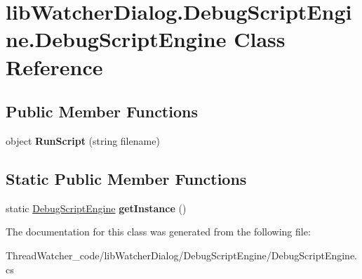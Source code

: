 \hypertarget{classlib_watcher_dialog_1_1_debug_script_engine_1_1_debug_script_engine}{\section{lib\+Watcher\+Dialog.\+Debug\+Script\+Engine.\+Debug\+Script\+Engine Class Reference}
\label{classlib_watcher_dialog_1_1_debug_script_engine_1_1_debug_script_engine}
}
\subsection*{Public Member Functions}
\begin{DoxyCompactItemize}
\item 
\hypertarget{classlib_watcher_dialog_1_1_debug_script_engine_1_1_debug_script_engine_afef7959aa8fde58b2cc10200ee3cbfa8}{object {\bfseries Run\+Script} (string filename)}\label{classlib_watcher_dialog_1_1_debug_script_engine_1_1_debug_script_engine_afef7959aa8fde58b2cc10200ee3cbfa8}

\end{DoxyCompactItemize}
\subsection*{Static Public Member Functions}
\begin{DoxyCompactItemize}
\item 
\hypertarget{classlib_watcher_dialog_1_1_debug_script_engine_1_1_debug_script_engine_a25130dc30396db69b877199eba128ed8}{static \hyperlink{classlib_watcher_dialog_1_1_debug_script_engine_1_1_debug_script_engine}{Debug\+Script\+Engine} {\bfseries get\+Instance} ()}\label{classlib_watcher_dialog_1_1_debug_script_engine_1_1_debug_script_engine_a25130dc30396db69b877199eba128ed8}

\end{DoxyCompactItemize}


The documentation for this class was generated from the following file\+:\begin{DoxyCompactItemize}
\item 
Thread\+Watcher\+\_\+code/lib\+Watcher\+Dialog/\+Debug\+Script\+Engine/Debug\+Script\+Engine.\+cs\end{DoxyCompactItemize}
